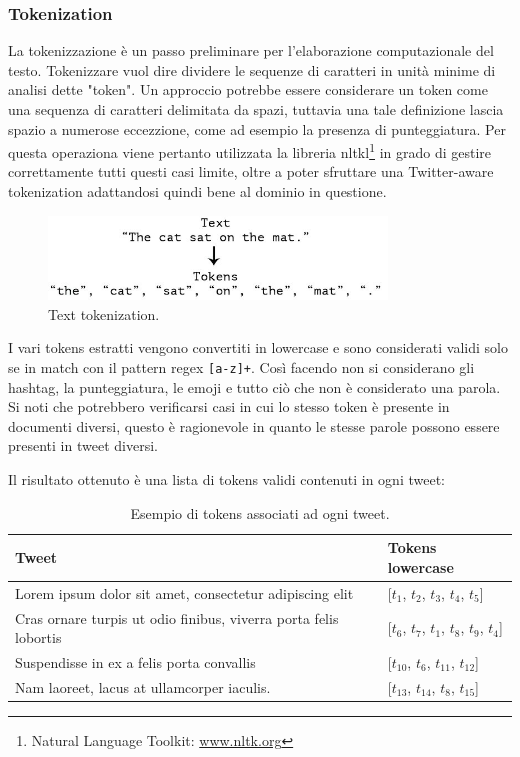 \documentclass[oneside]{book}
\begin{document}
\subsubsection{Tokenization}
La tokenizzazione è un passo preliminare per l'elaborazione computazionale del testo. Tokenizzare vuol dire dividere le sequenze di caratteri in unità minime di analisi dette "token". Un approccio potrebbe essere considerare un token come una sequenza di caratteri delimitata da spazi, tuttavia una tale definizione lascia spazio a numerose eccezzione, come ad esempio la presenza di punteggiatura. Per questa operaziona viene pertanto utilizzata la libreria
nltkl\footnote{Natural Language Toolkit: \url{www.nltk.org}} in grado di gestire correttamente tutti questi casi limite, oltre a poter sfruttare una Twitter-aware tokenization adattandosi quindi bene al dominio in questione.

\begin{figure}[!h]
	\centering
	\includegraphics[width=9cm]{assets/text-to-tokens.jpg}
	\caption{Text tokenization.}
	\label{fig:tokenization}
\end{figure}


\pagebreak

I vari tokens estratti vengono convertiti in lowercase e sono considerati validi solo se in match con il pattern regex \texttt{[a-z]+}. Così facendo non si considerano gli hashtag, la punteggiatura, le emoji e tutto ciò che non è considerato una parola. Si noti che potrebbero verificarsi casi in cui lo stesso token è presente in documenti diversi, questo è ragionevole in quanto le stesse parole possono essere presenti in tweet diversi.


Il risultato ottenuto è una lista di tokens validi contenuti in ogni tweet:

\begin{table}[h!]
	\centering
	\begin{tabular}[t]{l|l}
		\hline
		\textbf{Tweet} & \textbf{Tokens lowercase}\\
		\hline
		Lorem ipsum dolor sit amet, consectetur adipiscing elit				& [$t_1$, $t_2$, $t_3$, $t_4$, $t_5$] \\
		Cras ornare turpis ut odio finibus, viverra porta felis lobortis 	& [$t_6$, $t_7$, $t_1$, $t_8$, $t_9$, $t_4$] \\
		Suspendisse in ex a felis porta convallis							& [$t_{10}$, $t_6$, $t_{11}$, $t_{12}$] \\
		Nam laoreet, lacus at ullamcorper iaculis.							& [$t_{13}$, $t_{14}$, $t_8$, $t_{15}$]\\
		
		\hline
	\end{tabular}
	\caption{Esempio di tokens associati ad ogni tweet.}
\end{table}
\end{document}
